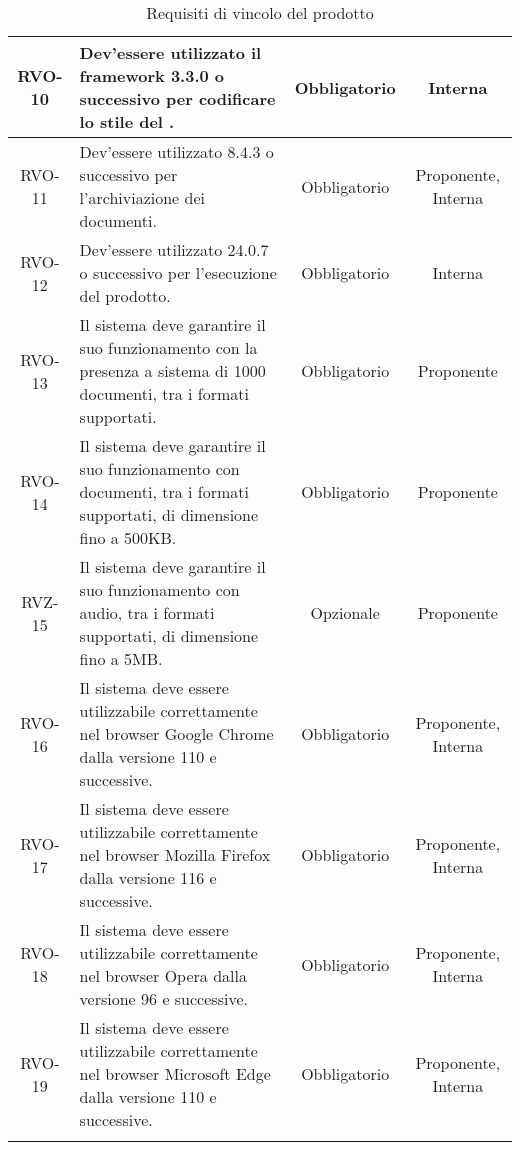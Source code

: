 \begin{xltabular}{\textwidth}{| c | X | c | c |}
    \hline
    RVO-10 & Dev'essere utilizzato il framework  3.3.0 o successivo per codificare lo stile del . & Obbligatorio & Interna \\
    \hline
    RVO-11 & Dev'essere utilizzato  8.4.3 o successivo per l'archiviazione dei documenti. & Obbligatorio & Proponente, Interna \\
    \hline
    RVO-12 & Dev'essere utilizzato  24.0.7 o successivo per l'esecuzione del prodotto. & Obbligatorio & Interna \\
    \hline
    RVO-13 & Il sistema deve garantire il suo funzionamento con la presenza a sistema di 1000 documenti, tra i formati supportati.  & Obbligatorio & Proponente\\ %
    \hline
    RVO-14 & Il sistema deve garantire il suo funzionamento con documenti, tra i formati supportati, di dimensione fino a 500KB. & Obbligatorio & Proponente\\ %
    \hline
    RVZ-15 & Il sistema deve garantire il suo funzionamento con audio, tra i formati supportati, di dimensione fino a 5MB. & Opzionale & Proponente\\
    \hline %
    RVO-16 & Il sistema deve essere utilizzabile correttamente nel browser Google Chrome dalla versione 110 e successive. & Obbligatorio & Proponente, Interna\\  %
    \hline
    RVO-17 & Il sistema deve essere utilizzabile correttamente nel browser Mozilla Firefox dalla versione 116 e successive. & Obbligatorio & Proponente, Interna\\  %
    \hline
    RVO-18 & Il sistema deve essere utilizzabile correttamente nel browser Opera dalla versione 96 e successive. & Obbligatorio & Proponente, Interna\\ %
    \hline
    RVO-19 & Il sistema deve essere utilizzabile correttamente nel browser Microsoft Edge dalla versione 110 e successive. & Obbligatorio & Proponente, Interna\\
    \hline
     \caption{Requisiti di vincolo del prodotto}
    \label{tab:reqvin}
\end{xltabular}
\endgroup

